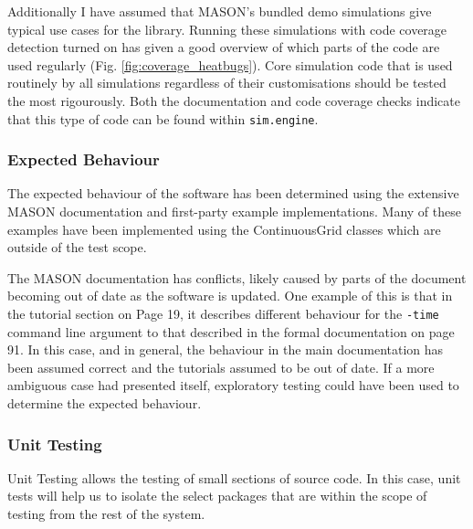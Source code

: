 \documentclass[11pt]{article}
\begin{document}
Additionally I have assumed that MASON's bundled demo simulations give typical use cases for the library.
Running these simulations with code coverage detection turned on has given a good overview of which parts of the code are used regularly (Fig. \ref{fig:coverage_heatbugs}).
Core simulation code that is used routinely by all simulations regardless of their customisations should be tested the most rigourously.
Both the documentation\cite[pp.85]{mason_doc} and code coverage checks indicate that this type of code can be found within \texttt{sim.engine}.


\subsubsection{Expected Behaviour}
The expected behaviour of the software has been determined using the extensive MASON documentation\cite{mason_doc} and first-party example implementations.
Many of these examples have been implemented using the ContinuousGrid classes which are outside of the test scope.

The MASON documentation has conflicts, likely caused by parts of the document becoming out of date as the software is updated.
One example of this is that in the tutorial section on Page 19, it describes different behaviour for the \texttt{-time} command line argument to that described in the formal documentation on page 91.
In this case, and in general, the behaviour in the main documentation has been assumed correct and the tutorials assumed to be out of date.
If a more ambiguous case had presented itself, exploratory testing could have been used to determine the expected behaviour.


\subsubsection{Unit Testing}
Unit Testing allows the testing of small sections of source code.
In this case, unit tests will help us to isolate the select packages that are within the scope of testing from the rest of the system.
\\
\end{document}
